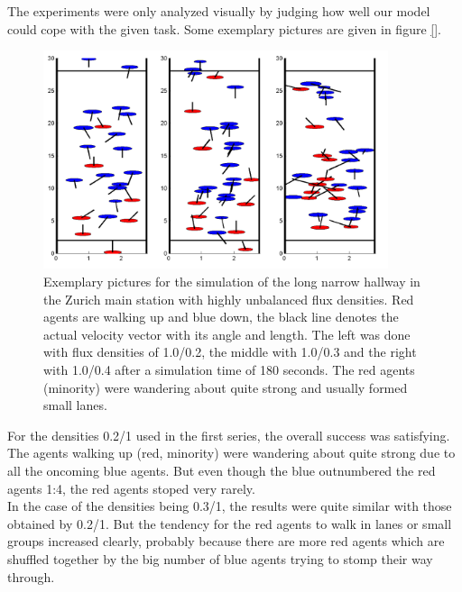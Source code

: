 
\noi The experiments were only analyzed visually by judging how well our model could cope with the given task. Some exemplary pictures are given in figure \ref{}.\\
\begin{figure}[h!]
	\centering
		\includegraphics[width=0.90\textwidth]{pictures/ex6picture.png}
	\caption{Exemplary pictures for the simulation of the long narrow hallway in the Zurich main station with highly unbalanced flux densities. Red agents are walking up and blue down, the black line denotes the actual velocity vector with its angle and length. The left was done with flux densities of 1.0/0.2, the middle with 1.0/0.3 and the right with 1.0/0.4 after a simulation time of 180 seconds. The red agents (minority) were wandering about quite strong and usually formed small lanes.}
	\label{fig:ex6picture}
\end{figure}

\noi For the densities 0.2/1 used in the first series, the overall success was satisfying. The agents walking up (red, minority) were wandering about quite strong due to all the oncoming blue agents. But even though the blue outnumbered the red agents 1:4, the red agents stoped very rarely.\\

\noi In the case of the densities being 0.3/1, the results were quite similar with those obtained by 0.2/1. But the tendency for the red agents to walk in lanes or small groups increased clearly, probably because there are more red agents which are shuffled together by the big number of blue agents trying to stomp their way through.\\

